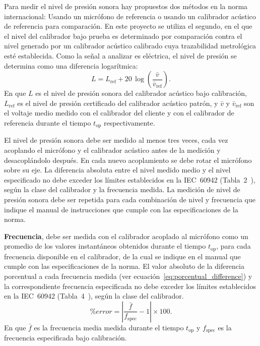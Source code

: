 Para medir el nivel de presión sonora hay propuestos dos métodos en la norma internacional: Usando un micrófono de referencia o usando un calibrador acústico de referencia para comparación.
En este proyecto se utiliza el segundo, en el que el nivel del calibrador bajo prueba es determinado por comparación contra el nivel generado por un calibrador acústico calibrado cuya trazabilidad metrológica esté establecida.
Como la señal a analizar es eléctrica, el nivel de presión se determina como una diferencia logarítmica:
\begin{equation}
    \label{eq:spl_from_voltage}
    L = L_{\mathrm{ref}} + 20\,\log\left(\frac{\bar{v}}{\bar{v}_{\mathrm{ref}}}\right).
\end{equation}
%
En que $L$ es el nivel de presión sonora del calibrador acústico bajo calibración, $L_{\mathrm{ref}}$ es el nivel de presión certificado del calibrador acústico patrón, y $\bar{v}$ y $\bar{v}_{\mathrm{ref}}$ son el voltaje medio medido con el calibrador del cliente y con el calibrador de referencia durante el tiempo $t_{\mathrm{op}}$ respectivamente.

El nivel de presión sonora debe ser medido al menos tres veces, cada vez acoplando el micrófono y el calibrador acústico antes de la medición y desacoplándolo después.
En cada nuevo acoplamiento se debe rotar el micrófono sobre su eje.
La diferencia absoluta entre el nivel medido medio y el nivel especificado no debe exceder los límites establecidos en la \mbox{IEC 60942} (\mbox{Tabla 2}~\citeyear{IEC_TC29_2017}), según la clase del calibrador y la frecuencia medida.
La medición de nivel de presión sonora debe ser repetida para cada combinación de nivel y frecuencia que indique el manual de instrucciones que cumple con las especificaciones de la norma.

\textbf{Frecuencia}, debe ser medida con el calibrador acoplado al micrófono como un promedio de los valores instantáneos obtenidos durante el tiempo $t_{\mathrm{op}}$, para cada frecuencia disponible en el calibrador, de la cual se indique en el manual que cumple con las especificaciones de la norma.
El valor absoluto de la diferencia porcentual a cada frecuencia medida (ver ecuación~\ref{eq:porcentual_difference}) y la correspondiente frecuencia especificada no debe exceder los límites establecidos en la \mbox{IEC 60942} (\mbox{Tabla 4}~\citeyear{IEC_TC29_2017}), según la clase del calibrador.
%
\begin{equation}
    \label{eq:porcentual_difference}
    \%error = \left|\frac{\bar{f}}{f_{\mathrm{spec}}} - 1\right| \times 100.
\end{equation}
%
En que $\bar{f}$ es la frecuencia media medida durante el tiempo $t_{\mathrm{op}}$ y $f_{\mathrm{spec}}$ es la frecuencia especificada bajo calibración.

